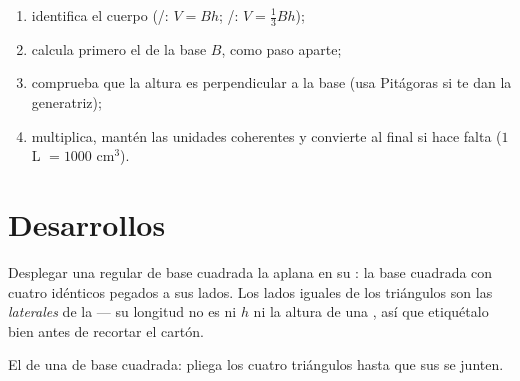\begin{method}\label{met:g8:solids:method}
\begin{enumerate}
  \item identifica el cuerpo (/: $V = Bh$; /:
        $V = \frac13 Bh$);
  \item calcula primero el  de la base $B$, como paso aparte;
  \item comprueba que la altura es perpendicular a la base (usa
        Pitágoras si te dan la generatriz);
  \item multiplica, mantén las unidades coherentes y convierte al final si hace falta
        ($1$ L $= 1000$ cm$^3$).
\end{enumerate}
\end{method}

\section{Desarrollos}

\begin{example}\label{ex:g8:solids:net}
Desplegar una  regular de base cuadrada la aplana en su
\emph{}: la base cuadrada con cuatro  idénticos
pegados a sus lados. Los lados iguales de los triángulos son las
\emph{ laterales} de la  --- su longitud no es ni $h$
ni la altura de una , así que etiquétalo bien antes de recortar
el cartón.
\end{example}

\begin{omfigure}

{\small El  de una  de base cuadrada: pliega los cuatro triángulos
hasta que sus  se junten.}
\end{omfigure}


